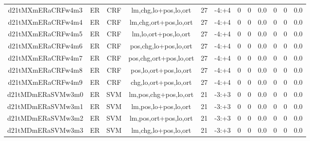 \documentclass[a4paper]{article}
\begin{document}
\begin{landscape}
\begin{center}
\begin{tabular}{ |c|c|c|c|c|c|c|c|c|c|c|c|}
 
 	
 	\small{ d21tMXmERaCRFw4m3 } & ER & CRF & lm,chg,lo+pos,lo,ort  &  27 &  -4:+4  &  0 & 0 & 0.0  &  0 & 0 & 0.0 \\
 	

 
 	
 	\small{ d21tMXmERaCRFw4m4 } & ER & CRF & lm,chg,ort+pos,lo,ort  &  27 &  -4:+4  &  0 & 0 & 0.0  &  0 & 0 & 0.0 \\
 	

 
 	
 	\small{ d21tMXmERaCRFw4m5 } & ER & CRF & lm,lo,ort+pos,lo,ort  &  27 &  -4:+4  &  0 & 0 & 0.0  &  0 & 0 & 0.0 \\
 	

 
 	
 	\small{ d21tMXmERaCRFw4m6 } & ER & CRF & pos,chg,lo+pos,lo,ort  &  27 &  -4:+4  &  0 & 0 & 0.0  &  0 & 0 & 0.0 \\
 	

 
 	
 	\small{ d21tMXmERaCRFw4m7 } & ER & CRF & pos,chg,ort+pos,lo,ort  &  27 &  -4:+4  &  0 & 0 & 0.0  &  0 & 0 & 0.0 \\
 	

 
 	
 	\small{ d21tMXmERaCRFw4m8 } & ER & CRF & pos,lo,ort+pos,lo,ort  &  27 &  -4:+4  &  0 & 0 & 0.0  &  0 & 0 & 0.0 \\
 	

 
 	
 	\small{ d21tMXmERaCRFw4m9 } & ER & CRF & chg,lo,ort+pos,lo,ort  &  27 &  -4:+4  &  0 & 0 & 0.0  &  0 & 0 & 0.0 \\
 	

 
 	
 	\small{ d21tMDmERaSVMw3m0 } & ER & SVM & lm,pos,chg+pos,lo,ort  &  21 &  -3:+3  &  0 & 0 & 0.0  &  0 & 0 & 0.0 \\
 	

 
 	
 	\small{ d21tMDmERaSVMw3m1 } & ER & SVM & lm,pos,lo+pos,lo,ort  &  21 &  -3:+3  &  0 & 0 & 0.0  &  0 & 0 & 0.0 \\
 	

 
 	
 	\small{ d21tMDmERaSVMw3m2 } & ER & SVM & lm,pos,ort+pos,lo,ort  &  21 &  -3:+3  &  0 & 0 & 0.0  &  0 & 0 & 0.0 \\
 	

 
 	
 	\small{ d21tMDmERaSVMw3m3 } & ER & SVM & lm,chg,lo+pos,lo,ort  &  21 &  -3:+3  &  0 & 0 & 0.0  &  0 & 0 & 0.0 \\
 	


\end{tabular}
\end{center}
\end{landscape}
\end{document}
